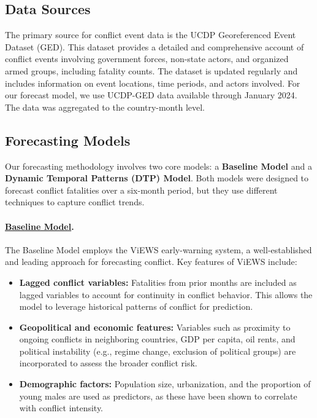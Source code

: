 \documentclass[twocolumn]{erdc}
\begin{document}
\subsection*{Data Sources}

The primary source for conflict event data is the UCDP Georeferenced Event Dataset (GED). This dataset provides a detailed and comprehensive account of conflict events involving government forces, non-state actors, and organized armed groups, including fatality counts. The dataset is updated regularly and includes information on event locations, time periods, and actors involved.  For our forecast model, we use UCDP-GED data available through January 2024. The data was aggregated to the country-month level. 

\subsection*{Forecasting Models}

Our forecasting methodology involves two core models: a \textbf{Baseline Model} and a \textbf{Dynamic Temporal Patterns (DTP) Model}. Both models were designed to forecast conflict fatalities over a six-month period, but they use different techniques to capture conflict trends.
%
\paragraph*{\underline{Baseline Model}.} The Baseline Model employs the ViEWS early-warning system, a well-established and leading approach for forecasting conflict. Key features of ViEWS include:
\begin{itemize}
    \item \textbf{Lagged conflict variables:} Fatalities from prior months are included as lagged variables to account for continuity in conflict behavior. This allows the model to leverage historical patterns of conflict for prediction.
    \item \textbf{Geopolitical and economic features:} Variables such as proximity to ongoing conflicts in neighboring countries, GDP per capita, oil rents, and political instability (e.g., regime change, exclusion of political groups) are incorporated to assess the broader conflict risk.
    \item \textbf{Demographic factors:} Population size, urbanization, and the proportion of young males are used as predictors, as these have been shown to correlate with conflict intensity.
\end{itemize}
    
\end{document}

